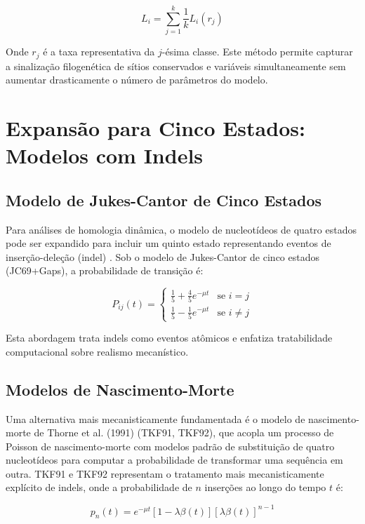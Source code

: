 \begin{equation}
L_i = \sum_{j=1}^{k} \frac{1}{k} L_i(r_j)
\end{equation}

Onde $r_j$ é a taxa representativa da $j$-ésima classe. Este método permite capturar a sinalização filogenética de sítios conservados e variáveis simultaneamente sem aumentar drasticamente o número de parâmetros do modelo.



\section{Expansão para Cinco Estados: Modelos com Indels}

\subsection{Modelo de Jukes-Cantor de Cinco Estados}

Para análises de homologia dinâmica, o modelo de nucleotídeos de quatro estados pode ser expandido para incluir um quinto estado representando eventos de inserção-deleção (indel) \parencite{wheeler2006,mcguire2001}. Sob o modelo de Jukes-Cantor de cinco estados (JC69+Gaps), a probabilidade de transição é:

$$P_{ij}(t) = \begin{cases} \frac{1}{5} + \frac{4}{5} e^{-\mu t} & \text{se } i = j \\ \frac{1}{5} - \frac{1}{5} e^{-\mu t} & \text{se } i \neq j \end{cases}$$

Esta abordagem trata indels como eventos atômicos e enfatiza tratabilidade computacional sobre realismo mecanístico.

\subsection{Modelos de Nascimento-Morte}

Uma alternativa mais mecanisticamente fundamentada é o modelo de nascimento-morte de Thorne et al. (1991) (TKF91, TKF92), que acopla um processo de Poisson de nascimento-morte com modelos padrão de substituição de quatro nucleotídeos para computar a probabilidade de transformar uma sequência em outra. TKF91 e TKF92 representam o tratamento mais mecanisticamente explícito de indels, onde a probabilidade de $n$ inserções ao longo do tempo $t$ é:

$$p_n(t) = e^{-\mu t}\left[1 - \lambda\beta(t)\right] \left[\lambda\beta(t)\right]^{n-1}$$

